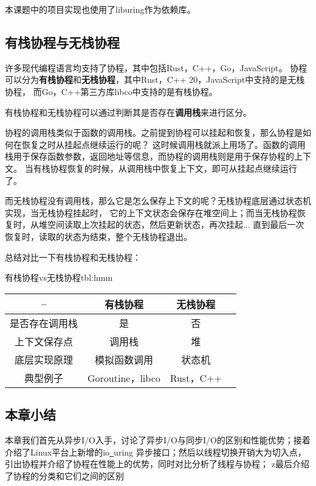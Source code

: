 \documentclass[supercite]{HustGraduPaper}
\theoremstyle{definition}
\begin{document}
本课题中的项目实现也使用了liburing作为依赖库。\par

\subsection{有栈协程与无栈协程}
许多现代编程语言均支持了协程，其中包括Rust，C++，Go，JavaScript。
协程可以分为\textbf{有栈协程}和\textbf{无栈协程}，其中Rust，C++ 20，JavaScript中支持的是无栈协程，
而Go，C++第三方库libco中支持的是有栈协程。\par

有栈协程和无栈协程可以通过判断其是否存在\textbf{调用栈}来进行区分。\par

协程的调用栈类似于函数的调用栈。之前提到协程可以挂起和恢复，那么协程是如何在恢复之时从挂起点继续运行的呢？
这时候调用栈就派上用场了。函数的调用栈用于保存函数参数，返回地址等信息，而协程的调用栈则是用于保存协程的上下文。
当有栈协程恢复的时候，从调用栈中恢复上下文，即可从挂起点继续运行了。\par

而无栈协程没有调用栈，那么它是怎么保存上下文的呢？无栈协程底层通过状态机实现，当无栈协程挂起时，
它的上下文状态会保存在堆空间上；而当无栈协程恢复时，从堆空间读取上次挂起的状态，然后更新状态，再次挂起...
直到最后一次恢复时，读取的状态为结束，整个无栈协程退出。\par

总结对比一下有栈协程和无栈协程：

\begin{generaltab}{有栈协程vs无栈协程}{tbl:hmm}
  \begin{tabular}{c|ccc}
    \toprule
    -- & 有栈协程 & 无栈协程 \\
    \midrule
    是否存在调用栈 & 是 & 否 \\
    上下文保存点 & 调用栈 & 堆 \\
    底层实现原理 & 模拟函数调用 & 状态机 \\
    典型例子 & Goroutine，libco & Rust，C++ \\
    \bottomrule
  \end{tabular}
\end{generaltab}

\subsection{本章小结}

本章我们首先从异步I/O入手，讨论了异步I/O与同步I/O的区别和性能优势；接着介绍了Linux平台上新增的io\underline{~}uring
异步接口；然后以线程切换开销大为切入点，引出协程并介绍了协程在性能上的优势，同时对比分析了线程与协程；
z最后介绍了协程的分类和它们之间的区别\par
\end{document}

